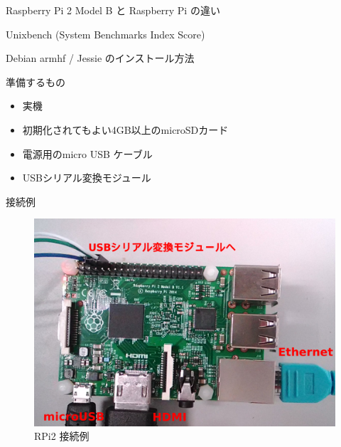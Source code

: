 \begin{frame}{Raspberry Pi 2 Model B と Raspberry Pi の違い}

Unixbench (System Benchmarks Index Score) 
\end{frame}


\begin{frame}{Debian armhf / Jessie のインストール方法}

準備するもの

\begin{itemize}
\item 実機
\item 初期化されてもよい4GB以上のmicroSDカード
\item 電源用のmicro USB ケーブル
\item USBシリアル変換モジュール
\end{itemize}

\end{frame}

\begin{frame}{接続例}
\begin{figure}[htbp]
\begin{center}
\includegraphics[width=0.7\hsize]{image201503/rpi2-hw-setting.png}
\end{center}
\caption{RPi2 接続例}
\label{fig:rpi2-hw-setting}
\end{figure}
\end{frame}

